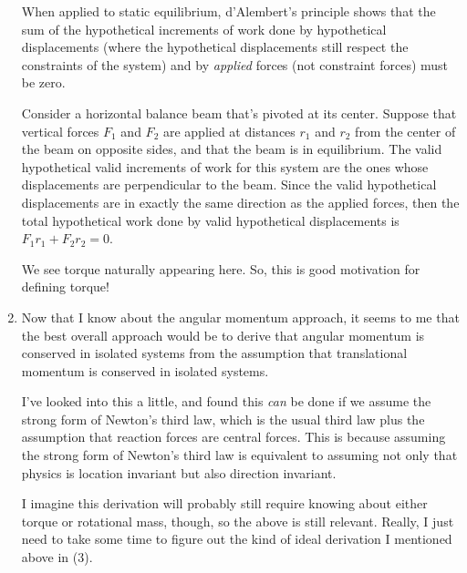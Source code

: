 \documentclass{article}
\begin{document}
\begin{enumerate}
    When applied to static equilibrium, d'Alembert's principle shows that the sum of the hypothetical increments of work done by hypothetical displacements (where the hypothetical displacements still respect the constraints of the system) and by \textit{applied} forces (not constraint forces) must be zero.
    
    Consider a horizontal balance beam that's pivoted at its center. Suppose that vertical forces $F_1$ and $F_2$ are applied at distances $r_1$ and $r_2$ from the center of the beam on opposite sides, and that the beam is in equilibrium. The valid hypothetical valid increments of work for this system are the ones whose displacements are perpendicular to the beam. Since the valid hypothetical displacements are in exactly the same direction as the applied forces, then the total hypothetical work done by valid hypothetical displacements is $F_1 r_1 + F_2 r_2 = 0$.

    We see torque naturally appearing here. So, this is good motivation for defining torque!

    \item Now that I know about the angular momentum approach, it seems to me that the best overall approach would be to derive that angular momentum is conserved in isolated systems from the assumption that translational momentum is conserved in isolated systems.

    I've looked into this a little, and found this \textit{can} be done if we assume the strong form of Newton's third law, which is the usual third law plus the assumption that reaction forces are central forces. This is because assuming the strong form of Newton's third law is equivalent to assuming not only that physics is location invariant but also direction invariant.
    
    I imagine this derivation will probably still require knowing about either torque or rotational mass, though, so the above is still relevant. Really, I just need to take some time to figure out the kind of ideal derivation I mentioned above in (3).
\end{enumerate}



\end{document}
